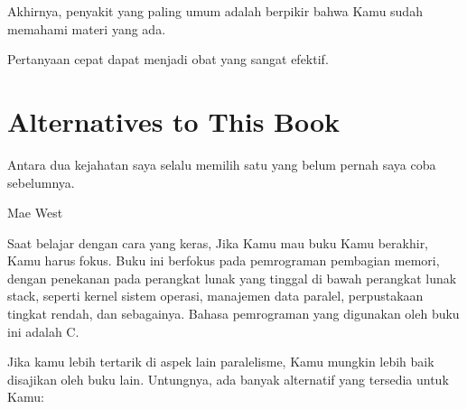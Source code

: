 Akhirnya, penyakit yang paling umum adalah berpikir bahwa
Kamu sudah memahami materi yang ada.

Pertanyaan cepat dapat menjadi obat yang sangat efektif.

\section{Alternatives to This Book}
\label{sec:Alternatives to This Book}
%
\epigraph{Antara dua kejahatan saya selalu memilih satu yang belum pernah saya coba sebelumnya.}
	 {Mae West}

Saat  belajar dengan cara yang keras, Jika Kamu
mau buku Kamu berakhir, Kamu harus fokus.
Buku ini berfokus pada pemrograman pembagian memori, dengan
penekanan pada perangkat lunak yang tinggal di bawah
perangkat lunak stack, seperti kernel sistem operasi,
manajemen data paralel, perpustakaan tingkat rendah, dan sebagainya.
Bahasa pemrograman yang digunakan oleh buku ini adalah C.

Jika kamu lebih tertarik di aspek lain paralelisme, Kamu mungkin
lebih baik disajikan oleh buku lain.
Untungnya, ada banyak alternatif yang tersedia untuk Kamu:

